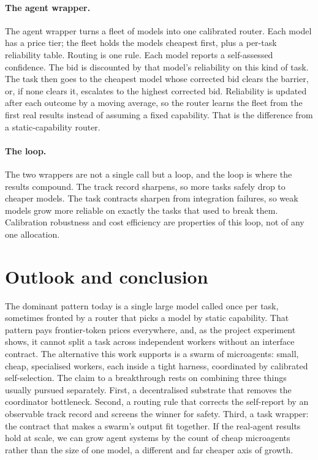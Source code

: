 \documentclass[11pt]{article}
\begin{document}
\paragraph{The agent wrapper.} The agent wrapper turns a fleet of models into one calibrated router. Each model has a price tier; the fleet holds the models cheapest first, plus a per-task reliability table. Routing is one rule. Each model reports a self-assessed confidence. The bid is discounted by that model's reliability on this kind of task. The task then goes to the cheapest model whose corrected bid clears the barrier, or, if none clears it, escalates to the highest corrected bid. Reliability is updated after each outcome by a moving average, so the router learns the fleet from the first real results instead of assuming a fixed capability. That is the difference from a static-capability router.

\paragraph{The loop.} The two wrappers are not a single call but a loop, and the loop is where the results compound. The track record sharpens, so more tasks safely drop to cheaper models. The task contracts sharpen from integration failures, so weak models grow more reliable on exactly the tasks that used to break them. Calibration robustness and cost efficiency are properties of this loop, not of any one allocation.

\section{Outlook and conclusion}

The dominant pattern today is a single large model called once per task, sometimes fronted by a router that picks a model by static capability. That pattern pays frontier-token prices everywhere, and, as the project experiment shows, it cannot split a task across independent workers without an interface contract. The alternative this work supports is a swarm of microagents: small, cheap, specialised workers, each inside a tight harness, coordinated by calibrated self-selection. The claim to a breakthrough rests on combining three things usually pursued separately. First, a decentralised substrate that removes the coordinator bottleneck. Second, a routing rule that corrects the self-report by an observable track record and screens the winner for safety. Third, a task wrapper: the contract that makes a swarm's output fit together. If the real-agent results hold at scale, we can grow agent systems by the count of cheap microagents rather than the size of one model, a different and far cheaper axis of growth.
\end{document}
